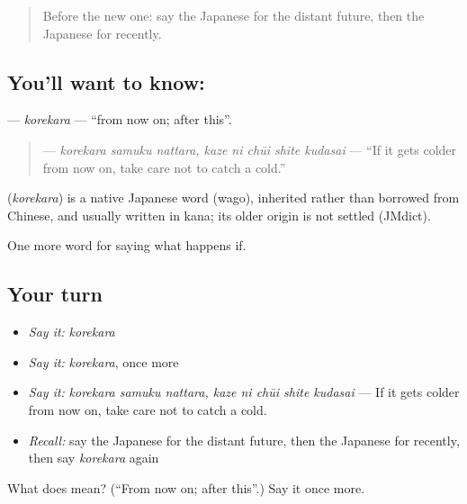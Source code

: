 \begin{quote}
Before the new one: say the Japanese for the distant future, then the Japanese for recently.
\end{quote}

\subsection*{You'll want to know: }
\textbf{} — \emph{korekara} — \textquotedblleft{}from now on; after this\textquotedblright{}.

\begin{quote}
\textbf{    } — \emph{korekara samuku nattara, kaze ni chūi shite kudasai} — \textquotedblleft{}If it gets colder from now on, take care not to catch a cold.\textquotedblright{}
\end{quote}

\begin{cousinweb}
\textbf{} (\emph{korekara}) is a native Japanese word (wago), inherited rather than borrowed from Chinese, and usually written in kana; its older origin is not settled (JMdict).
\end{cousinweb}

\begin{grammarlens}[title={What you've built}]
One more word for saying what happens if.
\end{grammarlens}

\subsection*{Your turn}
\begin{itemize}
\raggedright
  \item \emph{Say it:} \emph{korekara}
  \item \emph{Say it:} \emph{korekara}, once more
  \item \emph{Say it:} \emph{korekara samuku nattara, kaze ni chūi shite kudasai} — If it gets colder from now on, take care not to catch a cold.
  \item \emph{Recall:} say the Japanese for the distant future, then the Japanese for recently, then say \emph{korekara} again
\end{itemize}

\begin{tcolorbox}[breakable,colback=teal!4,colframe=teal!35!black,title={Before you move on}]
What does  mean? (\textquotedblleft{}From now on; after this\textquotedblright{}.) Say it once more.
\end{tcolorbox}

